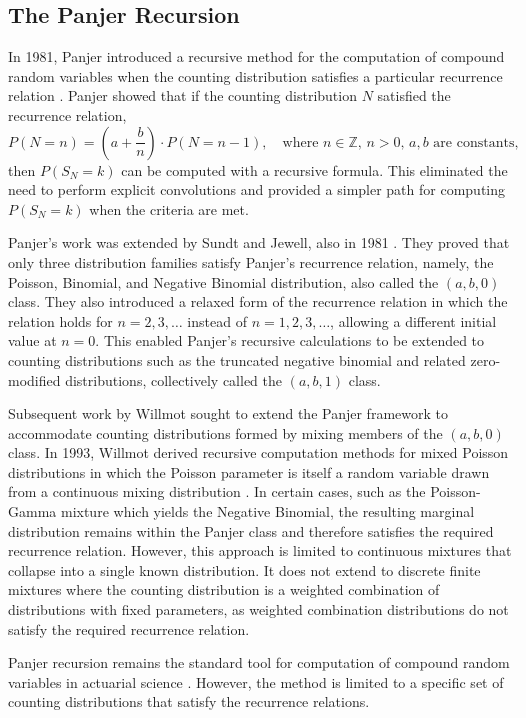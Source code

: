 \documentclass[11pt]{amsart}
\theoremstyle{definition}
\theoremstyle{plain}
\begin{document}
\subsection{The Panjer Recursion}

In 1981, Panjer introduced a recursive method for the computation of compound random
variables when the counting distribution satisfies a particular recurrence relation
\cite{panjer1981}. Panjer showed that if the counting distribution $N$ satisfied the recurrence
relation,
\[
    P(N = n) = \left(a + \frac{b}{n}\right) \cdot P(N = n - 1), \quad
    \text{where } n \in \mathbb{Z},\, n > 0,\, a, b \text{ are constants,}
\]
then $P(S_N = k)$ can be computed with a recursive formula. This eliminated the need to
perform explicit convolutions and provided a simpler path for computing $P(S_N = k)$ when
the criteria are met.

Panjer's work was extended by Sundt and Jewell, also in 1981 \cite{sundt-jewell1981}. They
proved that only three distribution families satisfy Panjer's recurrence relation, namely, the
Poisson, Binomial, and Negative Binomial distribution, also called the $(a, b, 0)$ class. They
also introduced a relaxed form of the recurrence relation in which the relation holds for
$n = 2, 3, \ldots$ instead of $n = 1, 2, 3, \ldots$, allowing a different initial value at $n = 0$.
This enabled Panjer's recursive calculations to be extended to counting distributions such as
the truncated negative binomial and related zero-modified distributions, collectively called the
$(a, b, 1)$ class.

Subsequent work by Willmot sought to extend the Panjer framework to accommodate
counting distributions formed by mixing members of the $(a, b, 0)$ class. In 1993, Willmot
derived recursive computation methods for mixed Poisson distributions in which the Poisson
parameter is itself a random variable drawn from a continuous mixing distribution
\cite{willmot1993}. In certain cases, such as the Poisson-Gamma mixture which yields the
Negative Binomial, the resulting marginal distribution remains within the Panjer class and
therefore satisfies the required recurrence relation. However, this approach is limited to
continuous mixtures that collapse into a single known distribution. It does not extend to
discrete finite mixtures where the counting distribution is a weighted combination of
distributions with fixed parameters, as weighted combination distributions do not satisfy
the required recurrence relation.

Panjer recursion remains the standard tool for computation of compound random variables
in actuarial science \cite{klugman2012}. However, the method is limited to a specific set of
counting distributions that satisfy the recurrence relations.
\end{document}

